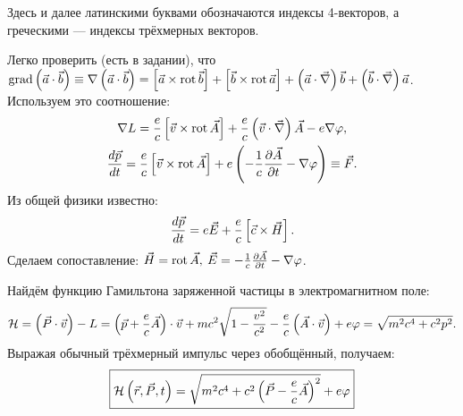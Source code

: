     \begin{note}
        Здесь и далее латинскими буквами обозначаются индексы 4-векторов, а греческими --- индексы трёхмерных векторов.
    \end{note}

    Легко проверить (есть в задании), что 
    $\operatorname{grad}\left({\vec{a}\cdot\vec{b}}\right) \equiv \nabla\left({\vec{a}\cdot\vec{b}}\right) =\left[{\vec{a}\times\operatorname{rot}\vec{b}}\right] + \left[{\vec{b}\times\operatorname{rot}\vec{a}}\right] + \left({\vec{a}\cdot\vec{\nabla}}\right)\vec{b} + \left({\vec{b}\cdot\vec{\nabla}}\right)\vec{a}$.
    Используем это соотношение:
    \begin{gather*}
        \nabla L = \frac{e}{c} \left[{\vec{v}\times\operatorname{rot}\vec{A}}\right] + \frac{e}{c}\left({\vec{v}\cdot\vec{\nabla}}\right)\vec{A} - e\nabla\varphi, \\
        \frac{d\vec{p}}{dt} = \frac{e}{c} \left[{\vec{v}\times\operatorname{rot}\vec{A}}\right] + e \left({-\frac{1}{c}\frac{\partial\vec{A}}{\partial t} - \nabla\varphi}\right) \equiv \vec{F}.
    \end{gather*}
    Из общей физики известно:
    \[
        \frac{d\vec{p}}{dt} = e\vec{E} + \frac{e}{c}\left[{\vec{c}\times\vec{H}}\right].
    \]
    Сделаем сопоставление: $\vec{H} = \operatorname{rot}\vec{A}, \: \vec{E} = -\frac{1}{c}\frac{\partial\vec{A}}{\partial t} - \nabla\varphi$.

    Найдём функцию Гамильтона заряженной частицы в электромагнитном поле:
    \[
        \mathcal{H} = \left({\vec{P}\cdot\vec{v}}\right) - L = \left({\vec{p} + \frac{e}{c}\vec{A}}\right)\cdot\vec{v}
        + mc^2\sqrt{1 - \frac{v^2}{c^2}} - \frac{e}{c}\left({\vec{A}\cdot\vec{v}}\right) + e\varphi = \sqrt{m^2c^4 + c^2p^2}.
    \]
    Выражая обычный трёхмерный импульс через обобщённый, получаем:
    \[
        \boxed{\mathcal{H}\left({\vec{r}, \vec{P}, t}\right) = \sqrt{m^2c^4 + c^2\left({\vec{P} - \frac{e}{c}\vec{A}}\right)^2} + e\varphi}
    \]

